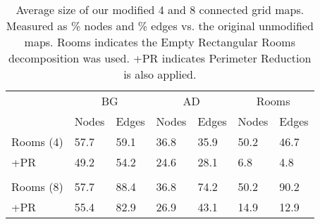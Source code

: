 \begin{table}[ht]
\caption{Average size of our modified 4 and 8 connected grid maps.
Measured as \% nodes and \% edges vs. the original unmodified maps.
Rooms indicates the Empty Rectangular Rooms decomposition was used.
+PR indicates Perimeter Reduction is also applied.}
\begin{center}
\begin{tabular*}{\columnwidth}{p{1.8cm}m{0.62cm}m{0.62cm}m{0.62cm}m{0.62cm}m{0.62cm}m{0.62cm}}
  \hline
   & \multicolumn{2}{c}{BG} & \multicolumn{2}{c}{AD} & \multicolumn{2}{c}{Rooms}\\
	& Nodes & Edges & Nodes & Edges & Nodes & Edges \\
  \hline
%
Rooms (4) & 57.7 & 59.1 & 36.8 & 35.9 & 50.2 & 46.7 \\ 
+PR & 49.2 & 54.2 & 24.6 & 28.1 & 6.8 & 4.8 \\  \\
Rooms (8) & 57.7 & 88.4 & 36.8 & 74.2 & 50.2 & 90.2 \\ 
+PR & 55.4 & 82.9 & 26.9 & 43.1 & 14.9 & 12.9 \\ 

   \hline
\end{tabular*}
\end{center}
\end{table}

